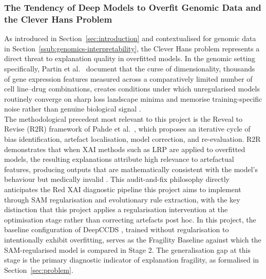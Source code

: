 \subsubsection{The Tendency of Deep Models to Overfit Genomic Data and the Clever Hans Problem}
\label{ssub:clever-hans-genomic}
As introduced in Section~\ref{sec:introduction} and contextualised for genomic data in
Section~\ref{ssub:genomics-interpretability}, the Clever Hans problem represents a direct threat to
explanation quality in overfitted models. In the genomic setting specifically, Partin et
al.~\cite{Partin2023} document that the curse of dimensionality, thousands of gene expression
features measured across a comparatively limited number of cell line–drug combinations, creates
conditions under which unregularised models routinely converge on sharp loss landscape minima and
memorise training-specific noise rather than genuine biological signal \cite{Li2018}.
\\
The methodological precedent most relevant to this project is the Reveal to Revise (R2R) framework of
Pahde et al.~\cite{Pahde2023}, which proposes an iterative cycle of bias identification, artefact
localisation, model correction, and re-evaluation. R2R demonstrates that when XAI methods such as LRP
are applied to overfitted models, the resulting explanations attribute high relevance to artefactual
features, producing outputs that are mathematically consistent with the model's behaviour but
medically invalid \cite{Pahde2023,Klauschen2024}. This audit-and-fix philosophy directly anticipates
the Red XAI diagnostic pipeline this project aims to implement through SAM regularisation and
evolutionary rule extraction, with the key distinction that this project applies a regularisation
intervention at the optimisation stage rather than correcting artefacts post hoc. In this project,
the baseline configuration of DeepCCDS \cite{Wu2025}, trained without regularisation to intentionally
exhibit overfitting, serves as the Fragility Baseline against which the SAM-regularised model is
compared in Stage 2. The generalisation gap at this stage is the primary diagnostic indicator of
explanation fragility, as formalised in Section~\ref{sec:problem}.